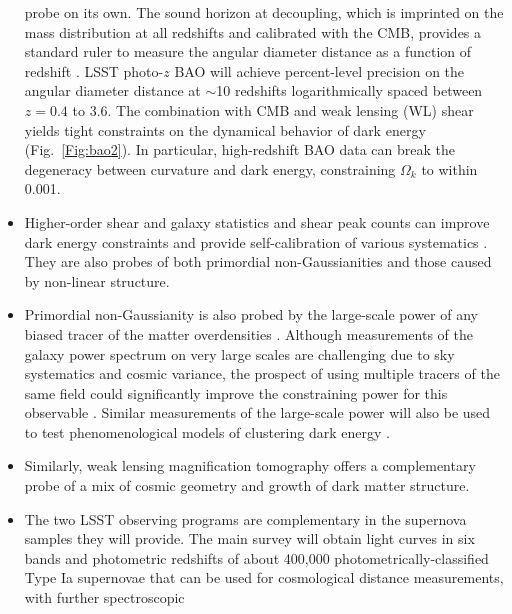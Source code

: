 \begin{itemize}
probe on its own. The sound horizon at decoupling, which is imprinted on the
mass distribution at all redshifts and calibrated with the CMB, provides a standard ruler to measure the angular diameter
distance as a function of redshift
\citep{1998ApJ...504L..57E,2001ApJ...557L...7C,2003ApJ...594..665B,2003PhRvD..68f3004H,2003PhRvD..68h3504L,2003ApJ...598..720S}.
LSST photo-$z$ BAO will achieve percent-level precision on the angular
diameter distance at $\sim$10 redshifts logarithmically spaced between $z = 0.4$ to 3.6. The combination with CMB
and weak lensing (WL) shear yields tight constraints on the
dynamical behavior of dark energy (Fig.~\ref{Fig:bao2}). In particular, high-redshift BAO data can break
the degeneracy between curvature and dark energy, constraining $\Omega_k$ to within
0.001.
\item Higher-order shear and galaxy statistics and shear peak counts can improve dark energy
constraints and provide self-calibration of various systematics
\citep{2004MNRAS.348..897T,2006MNRAS.366..884D,2006MNRAS.366..101H,2016PhRvD..94f3534P}. They are also probes of both
primordial non-Gaussianities and those caused by non-linear structure.
\item Primordial non-Gaussianity is also probed by the large-scale power of any biased tracer of the matter
overdensities \citep{2008PhRvD..77l3514D}. Although measurements of the galaxy power spectrum on very large scales
are challenging due to sky systematics \citep{2014PhRvL.113v1301L} and cosmic variance, the prospect of using
multiple tracers of the same field could significantly improve the constraining power for this observable
\citep{2009PhRvL.102b1302S}. Similar measurements of the large-scale power will also be used to test phenomenological
models of clustering dark energy \citep{2006PhRvD..74d3505T}.
\item Similarly, weak lensing magnification tomography \citep{2012MNRAS.426.2489M} offers a
complementary probe of a mix of cosmic geometry and growth of dark matter structure.
\item The two LSST observing programs are complementary in the supernova samples they will provide. The main survey will
obtain light curves in six bands and photometric redshifts of about 400,000 photometrically-classified Type
Ia supernovae that can be used for cosmological distance measurements, with further spectroscopic

\end{itemize}
